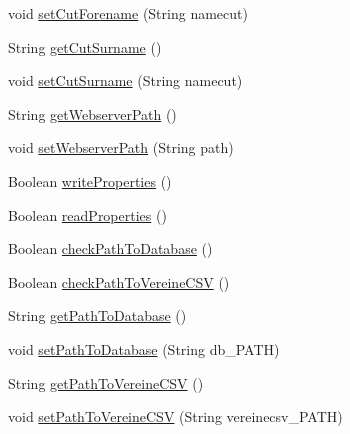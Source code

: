 \begin{DoxyCompactItemize}
\item 
void \hyperlink{classde_1_1turnierverwaltung_1_1control_1_1_properties_control_accf4d5dc5f9a5c872396a965e531f1da}{set\+Cut\+Forename} (String namecut)
\item 
String \hyperlink{classde_1_1turnierverwaltung_1_1control_1_1_properties_control_a55524672497dc6f6789e4a28732ac848}{get\+Cut\+Surname} ()
\item 
void \hyperlink{classde_1_1turnierverwaltung_1_1control_1_1_properties_control_ad929fb6b63dd600644e41a8c9fca00aa}{set\+Cut\+Surname} (String namecut)
\item 
String \hyperlink{classde_1_1turnierverwaltung_1_1control_1_1_properties_control_a770e4c28ed5f18e4d332831f2fd2435a}{get\+Webserver\+Path} ()
\item 
void \hyperlink{classde_1_1turnierverwaltung_1_1control_1_1_properties_control_af09cd6af615f04a6916d51fc44c48c4b}{set\+Webserver\+Path} (String path)
\item 
Boolean \hyperlink{classde_1_1turnierverwaltung_1_1control_1_1_properties_control_ab0ac6ff172adda0d938c5a9c3c155d4f}{write\+Properties} ()
\item 
Boolean \hyperlink{classde_1_1turnierverwaltung_1_1control_1_1_properties_control_ab724b40da3ab65aa44f3504787b6ea5b}{read\+Properties} ()
\item 
Boolean \hyperlink{classde_1_1turnierverwaltung_1_1control_1_1_properties_control_af4b72d42ef4852bab12ca51b3dcfc9f6}{check\+Path\+To\+Database} ()
\item 
Boolean \hyperlink{classde_1_1turnierverwaltung_1_1control_1_1_properties_control_a08399e51eaaf1ef113720a3f220d6474}{check\+Path\+To\+Vereine\+C\+SV} ()
\item 
String \hyperlink{classde_1_1turnierverwaltung_1_1control_1_1_properties_control_a181798ac4f309902e90b4a8e48aaa511}{get\+Path\+To\+Database} ()
\item 
void \hyperlink{classde_1_1turnierverwaltung_1_1control_1_1_properties_control_a92057ef4235c8483fb77e22612e4af51}{set\+Path\+To\+Database} (String db\+\_\+\+P\+A\+TH)
\item 
String \hyperlink{classde_1_1turnierverwaltung_1_1control_1_1_properties_control_a13251fbbeb67af773a0687903609666a}{get\+Path\+To\+Vereine\+C\+SV} ()
\item 
void \hyperlink{classde_1_1turnierverwaltung_1_1control_1_1_properties_control_a35d82ca5099ac63d8b97323e675327f4}{set\+Path\+To\+Vereine\+C\+SV} (String vereinecsv\+\_\+\+P\+A\+TH)
\item 

\end{DoxyCompactItemize}
